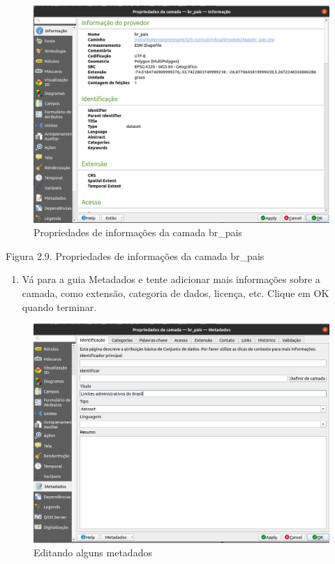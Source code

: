 \documentclass[
]{book}
\providecommand{\tightlist}{%
  \setlength{\itemsep}{0pt}\setlength{\parskip}{0pt}}
\begin{document}
\begin{figure}
\centering
\includegraphics{media/modulo2/metadata-1.png}
\caption{Propriedades de informações da camada br\_pais}
\end{figure}

Figura 2.9. Propriedades de informações da camada br\_pais

\begin{enumerate}
\def\labelenumi{\arabic{enumi}.}
\setcounter{enumi}{2}
\tightlist
\item
  Vá para a guia Metadados e tente adicionar mais informações sobre a camada, como extensão, categoria de dados, licença, etc. Clique em OK quando terminar.
\end{enumerate}

\begin{figure}
\centering
\includegraphics{media/modulo2/metadata-2.png}
\caption{Editando alguns metadados}
\end{figure}
\end{document}
